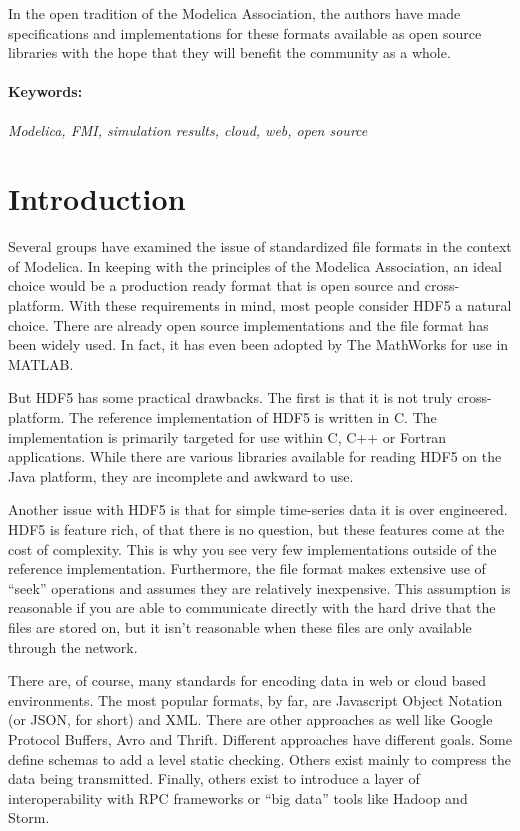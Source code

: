 \documentclass[11pt,a4paper,twocolumn]{article}
\begin{document}
In the open tradition of the Modelica Association, the authors have
made specifications and implementations for these formats available as
open source libraries with the hope that they will benefit the
community as a whole.

\paragraph{Keywords:}\emph{Modelica, FMI, simulation results,
  cloud, web, open source}

\section{Introduction}
\label{sec:intro}

Several groups have examined the issue of standardized file
formats\cite{AndreasHDF5,GallHDF5} in the context of Modelica.  In keeping
with the principles of the Modelica Association, an ideal choice would
be a production ready format that is open source and cross-platform.
With these requirements in mind, most people consider HDF5 a natural
choice.  There are already open source implementations and the file
format has been widely used.  In fact, it has even been adopted by The
MathWorks for use in MATLAB.

But HDF5 has some practical drawbacks.  The first is that it is not
truly cross-platform.  The reference implementation of HDF5 is written
in C.  The implementation is primarily targeted for use within C, C++
or Fortran applications.  While there are various libraries available
for reading HDF5 on the Java platform\cite{HDFJava}, they are
incomplete and awkward to use.

Another issue with HDF5 is that for simple time-series data it is over
engineered.  HDF5 is feature rich, of that there is no question, but
these features come at the cost of complexity.  This is why you see
very few implementations outside of the reference implementation.
Furthermore, the file format makes extensive use of ``seek''
operations and assumes they are relatively inexpensive.  This
assumption is reasonable if you are able to communicate directly with
the hard drive that the files are stored on, but it isn't reasonable
when these files are only available through the network.

There are, of course, many standards for encoding data in web or cloud
based environments.  The most popular formats, by far, are Javascript
Object Notation (or JSON, for short) and XML.  There are other
approaches as well like Google Protocol Buffers\cite{GPB},
Avro\cite{Avro} and Thrift\cite{Thrift}.  Different approaches have
different goals.  Some define schemas to add a level static checking.
Others exist mainly to compress the data being transmitted.  Finally,
others exist to introduce a layer of interoperability with RPC
frameworks or ``big data'' tools like Hadoop\cite{Hadoop} and
Storm\cite{Storm}.
\end{document}
